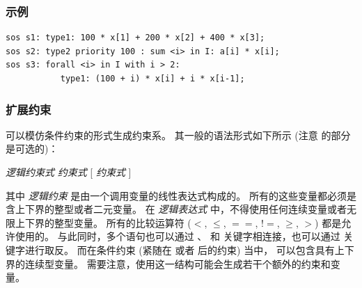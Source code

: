 \subsubsection{示例}
{\small
\begin{verbatim}
sos s1: type1: 100 * x[1] + 200 * x[2] + 400 * x[3];
sos s2: type2 priority 100 : sum <i> in I: a[i] * x[i];
sos s3: forall <i> in I with i > 2:
           type1: (100 + i) * x[i] + i * x[i-1];
\end{verbatim}
}

\subsubsection{扩展约束}
\zimpl 可以模仿条件约束的形式生成约束系。
其一般的语法形式如下所示 (注意  的部分是可选的)：

\smallskip
\centerline{
 \emph{逻辑约束式}  \emph{约束式}
[  \emph{约束式} ] }

\smallskip
\noindent 其中 \emph{逻辑约束} 是由一个调用变量的线性表达式构成的。
所有的这些变量都必须是含上下界的整型或者二元变量。
在 \emph{逻辑表达式} 中，不得使用任何连续变量或者无限上下界的整型变量。
所有的比较运算符 ($<$, $\le$, $==$, $!\!\!=$, $\ge$, $>$) 都是允许使用的。
与此同时，多个语句也可以通过 、 和 
关键字相连接，也可以通过  关键字进行取反。
而在条件约束 (紧随在  或者  后的约束) 当中，
可以包含具有上下界的连续型变量。
需要注意，使用这一结构可能会生成若干个额外的约束和变量。

